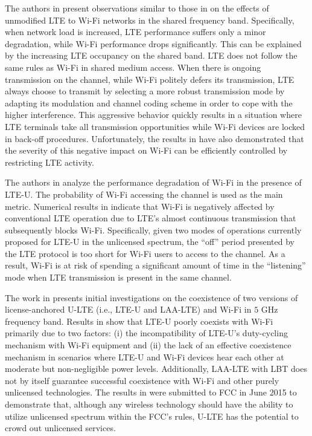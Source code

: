 \documentclass[journal,draftclsnofoot,12pt,onecolumn]{IEEEtran}
\begin{document}
The authors in \cite{original-LTE-Wi-Fi-WCNC-2013} present observations similar to those in \cite{original-LTE-Wi-Fi-VTC-2013} on the effects of unmodified LTE to Wi-Fi networks in the shared frequency band. Specifically, when network load is increased, LTE performance suffers only a minor degradation, while Wi-Fi performance drops significantly. This can be explained by the increasing LTE occupancy on the shared band. LTE does not follow the same rules as Wi-Fi in shared medium access. When there is ongoing transmission on the channel, while Wi-Fi politely defers its transmission, LTE always choose to transmit by selecting a more robust transmission mode by adapting its modulation and channel coding scheme in order to cope with the higher interference. This aggressive behavior quickly results in a situation where LTE terminals take all transmission opportunities while Wi-Fi devices are locked in back-off procedures. Unfortunately, the results in \cite{original-LTE-Wi-Fi-WCNC-2013} have also demonstrated that the severity of this negative impact on Wi-Fi can be efficiently controlled by restricting LTE activity.

The authors in \cite{LTE-U-PIMRC-2014} analyze the performance degradation of Wi-Fi in the presence of LTE-U. The probability of Wi-Fi accessing the channel is used as the main metric. Numerical results in \cite{LTE-U-PIMRC-2014} indicate that Wi-Fi is negatively affected by conventional LTE operation due to LTE's almost continuous transmission that subsequently blocks Wi-Fi. Specifically, given two modes of operations currently proposed for LTE-U in the unlicensed spectrum, the ``off'' period presented by the LTE protocol is too short for Wi-Fi users to access to the channel. As a result, Wi-Fi is at risk of spending a significant amount of time in the ``listening'' mode when LTE transmission is present in the same channel.

The work in \cite{U-LTE-Google-WP} presents initial investigations on the coexistence of two versions of license-anchored U-LTE (i.e., LTE-U and LAA-LTE) and Wi-Fi in $5$ GHz frequency band. Results in \cite{U-LTE-Google-WP} show that LTE-U poorly coexists with Wi-Fi primarily due to two factors: (i) the incompatibility of LTE-U's duty-cycling mechanism with Wi-Fi equipment and (ii) the lack of an effective coexistence mechanism in scenarios where LTE-U and Wi-Fi devices hear each other at moderate but non-negligible power levels. Additionally, LAA-LTE with LBT does not by itself guarantee successful coexistence with Wi-Fi and other purely unlicensed technologies. The results in \cite{U-LTE-Google-WP} were submitted to FCC in June 2015 to demonstrate that, although any wireless technology should have the ability to utilize unlicensed spectrum within the FCC's rules, U-LTE has the potential to crowd out unlicensed services.
\end{document}
